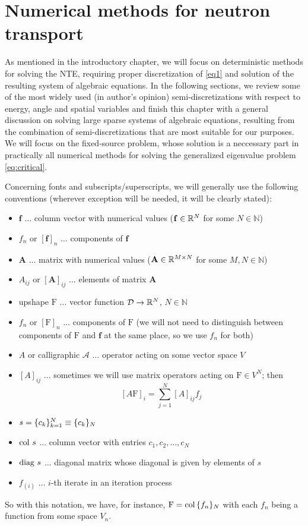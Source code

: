 \ifpdf
	\graphicspath{{3/pic/PNG/}{3/pic/PDF/}{3/pic/}}
\else
	\graphicspath{{3/pic/EPS/}{3/pic/}}
\fi

\chapter{Numerical methods for neutron transport}\label{chap:nte-methods}

As mentioned in the introductory chapter, we will focus on deterministic methods for solving the NTE, requiring proper
discretization of \eqref{eq1} and solution of the resulting system of algebraic equations. 
In the following sections, we review some of the most widely used (in author's opinion) semi-discretizations with respect to
energy, angle and spatial variables and finish this chapter with a general discussion on solving large sparse systems of
algebraic equations, resulting from the combination of semi-discretizations that are most suitable for our purposes. We
will focus on the fixed-source problem, whose solution is a neccessary part in practically all numerical methods for
solving the generalized eigenvalue problem \eqref{eq:critical}.

Concerning fonts and subscripts/superscripts, we will generally use the following conventions (wherever exception will
be needed, it will be clearly stated):
\begin{itemize}
  \item $\mathbf{f}$ $\ldots$ column vector with numerical values ($\mathbf{f}\in\R[N]$ for some $N\in\mathbb{N}$)
  \item $f_n$ or $[\mathbf{f}]_n$ $\ldots$ components of $\mathbf{f}$
  \item $\mathbf{A}$ $\ldots$ matrix with numerical values ($\mathbf{A}\in\R[M\times N]$ for some $M,N\in\mathbb{N}$)
  \item $A_{ij}$ or $[\mathbf{A}]_{ij}$ $\ldots$ elements of matrix $\mathbf{A}$
  \item upshape $\mathrm{F}$ $\ldots$ vector function $\VV\to\R[N]$, $N\in\mathbb{N}$ 
  \item $f_n$ or $[\mathrm{F}]_n$ $\ldots$ components of $\mathrm{F}$ (we will not need to distinguish between
  components of $\mathrm{F}$ and $\mathbf{f}$ at the same place, so we use $f_n$ for both)
  \item $A$ or calligraphic $\mathcal{A}$ $\ldots$ operator acting on some vector space $V$
  \item $[A]_{ij}$ $\ldots$ sometimes we will use matrix operators acting on $\mathrm{F}\in V^N$; then 
  $$
  	[A \mathrm{F}]_{i} = \sum_{j=1}^N [A]_{ij} f_j
  $$
  \item $s = \{c_k\}_{k=1}^N \equiv \{c_k\}_\idxset{N}$
  \item $\col s$ $\ldots$ column vector with entries $c_1,c_2,\ldots,c_N$
  \item $\diag s$ $\ldots$ diagonal matrix whose diagonal is given by elements of $s$
  \item $f_{(i)}$ $\ldots$ $i$-th iterate in an iteration process
\end{itemize}
So with this notation, we have, for instance, $\mathrm{F} = \col \{f_n\}_N$ with each $f_n$ being a function from some
space $V_n$.

